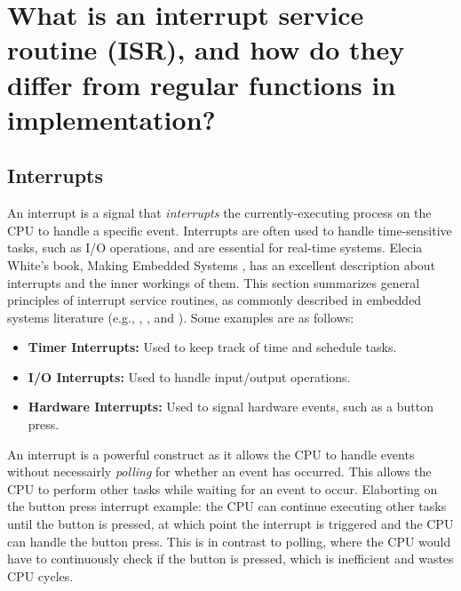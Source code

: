 \documentclass[main.tex]{subfiles}
\begin{document}
\section{What is an interrupt service routine (ISR), and how do they differ from regular functions in implementation?}

\spoilerline

\subsection{Interrupts}
An interrupt is a signal that \textit{interrupts} the currently-executing process on the CPU to handle a specific event. Interrupts are often used to handle time-sensitive tasks, such as I/O operations, and are essential for real-time systems. Elecia White's book, Making Embedded Systems \cite{white2024}, has an excellent description about interrupts and the inner workings of them. This section summarizes general principles of interrupt service routines, as commonly described in embedded systems literature (e.g., \cite{white2024}, \cite{myersInterrupts}, and \cite{BetterEmbeddedSystemSoftware}).
Some examples are as follows:
\begin{itemize}
    \item \textbf{Timer Interrupts:} Used to keep track of time and schedule tasks.
    \item \textbf{I/O Interrupts:} Used to handle input/output operations.
    \item \textbf{Hardware Interrupts:} Used to signal hardware events, such as a button press.
\end{itemize}
\noindent An interrupt is a powerful construct as it allows the CPU to handle events without necessairly \textit{polling} for whether an event has occurred. This allows the CPU to perform other tasks while waiting for an event to occur. \newline
\newline
\noindent Elaborting on the button press interrupt example: the CPU can continue executing other tasks until the button is pressed, at which point the interrupt is triggered and the CPU can handle the button press. This is in contrast to polling, where the CPU would have to continuously check if the button is pressed, which is inefficient and wastes CPU cycles.
\end{document}
